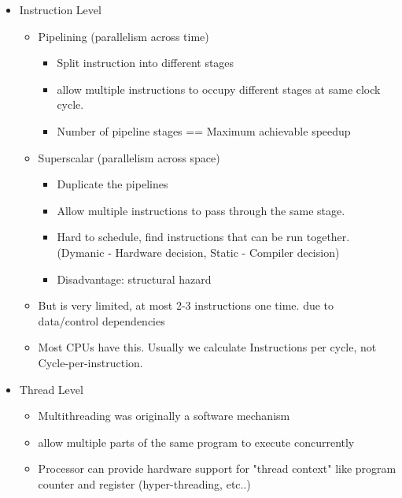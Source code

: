 \documentclass{article}
\begin{document}
\begin{itemize}
\begin{itemize}
              \item Instruction Level
                    \begin{itemize}
                        \item Pipelining (parallelism across time)
                              \begin{itemize}
                                  \item Split instruction into different stages
                                  \item allow multiple instructions to occupy different stages at same clock cycle.
                                  \item Number of pipeline stages == Maximum achievable speedup
                              \end{itemize}
                        \item Superscalar (parallelism across space)
                              \begin{itemize}
                                  \item Duplicate the pipelines
                                  \item Allow multiple instructions to pass through the same stage.
                                  \item Hard to schedule, find instructions that can be run together. (Dymanic - Hardware decision, Static - Compiler decision)
                                  \item Disadvantage: structural hazard
                              \end{itemize}
                        \item But is very limited, at most 2-3 instructions one time. due to data/control dependencies
                        \item Most CPUs have this. Usually we calculate Instructions per cycle, not Cycle-per-instruction.
                    \end{itemize}
              \item Thread Level
                    \begin{itemize}
                        \item Multithreading was originally a software mechanism
                        \item allow multiple parts of the same program to execute concurrently
                        \item Processor can provide hardware support for "thread context" like program counter and register (hyper-threading, etc..)

\end{itemize}
\end{itemize}
\end{itemize}
\end{document}

